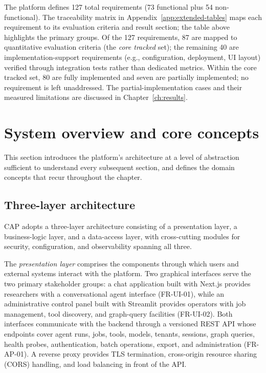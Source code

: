 \documentclass[a4paper]{sapthesis}
\begin{document}
The platform defines 127 total requirements (73 functional plus
54 non-functional).  The traceability matrix in
Appendix~\ref{app:extended-tables} maps each requirement to its
evaluation criteria and result section; the table above highlights the
primary groups.  Of the 127 requirements, 87 are mapped to quantitative
evaluation criteria (the \emph{core tracked} set); the remaining 40 are
implementation-support requirements (e.g., configuration, deployment,
UI layout) verified through integration tests rather than dedicated
metrics.  Within the core tracked set, 80 are fully implemented and seven
are partially implemented; no requirement is left unaddressed.
The partial-implementation cases and their measured limitations are
discussed in Chapter~\ref{ch:results}.


\section{System overview and core concepts}
\label{sec:system-overview}

This section introduces the platform's architecture at a level of
abstraction sufficient to understand every subsequent section, and defines
the domain concepts that recur throughout the chapter.

\subsection{Three-layer architecture}

CAP adopts a three-layer architecture consisting of a presentation layer,
a business-logic layer, and a data-access layer, with cross-cutting
modules for security, configuration, and observability spanning all three.

The \emph{presentation layer} comprises the components through which
users and external systems interact with the platform.  Two graphical
interfaces serve the two primary stakeholder groups: a chat application
built with Next.js provides researchers with a conversational agent
interface (FR-UI-01), while an administrative control panel built with
Streamlit provides operators with job management, tool discovery, and
graph-query facilities (FR-UI-02).  Both interfaces communicate with the
backend through a versioned REST API whose endpoints cover agent runs,
jobs, tools, models, tenants, sessions, graph queries, health probes,
authentication, batch operations, export, and administration (FR-AP-01).  A reverse proxy
provides TLS termination, cross-origin resource sharing (CORS) handling,
and load balancing in front of the API.
\end{document}
